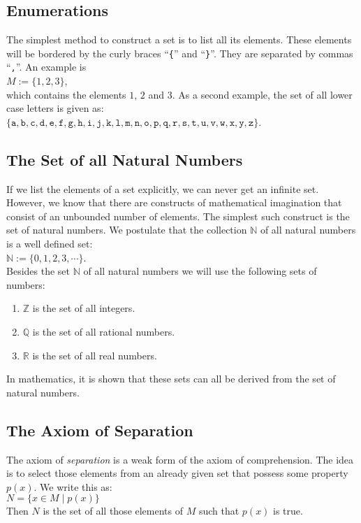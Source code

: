 \subsection{Enumerations}
The simplest method to construct a set is to list all its elements.  These elements
will be bordered by the curly braces ``\texttt{\{}'' and ``\texttt{\}}''.  They are
separated by commas ``\texttt{,}''.
An example is \\[0.2cm]
\hspace*{1.3cm} $M := \{ 1, 2, 3 \}$, \\[0.2cm]
which contains the elements  $1$, $2$ and $3$.
As a second example, the set of all lower case letters is given as: 
\\[0.2cm]
\hspace*{1.3cm} 
$\{\mathtt{a}, \mathtt{b}, \mathtt{c}, \mathtt{d}, \mathtt{e},
 \mathtt{f}, \mathtt{g}, \mathtt{h}, \mathtt{i}, \mathtt{j}, \mathtt{k}, \mathtt{l},
 \mathtt{m}, \mathtt{n}, \mathtt{o}, \mathtt{p}, \mathtt{q}, \mathtt{r}, \mathtt{s},
 \mathtt{t}, \mathtt{u}, \mathtt{v}, \mathtt{w}, \mathtt{x}, \mathtt{y}, \mathtt{z\}}$.

\subsection{The Set of all Natural Numbers}
If we list the elements of a set explicitly, we can never get an infinite set.
However, we know that there are constructs of mathematical imagination that consist
of an unbounded number of elements.  The simplest such construct is the set of natural
numbers.  We postulate that the collection $\mathbb{N}$ of all natural numbers is a well
defined set: \\[0.2cm]
\hspace*{1.3cm} $\mathbb{N} := \{ 0, 1, 2, 3, \cdots \}$. \\[0.2cm]
Besides the set $\mathbb{N}$ of all natural numbers we will use the following sets of
numbers:
\begin{enumerate}
\item $\mathbb{Z}$ is the set of all integers.
\item $\mathbb{Q}$ is the set of all rational numbers.
\item $\mathbb{R}$ is the set of all real numbers.
\end{enumerate}
In mathematics, it is shown that these sets can all be derived from the set of natural numbers.

\subsection{The Axiom of Separation}
The axiom of \emph{separation}  is a weak form of the axiom of comprehension.
The idea is to select those elements from an already given set that possess some property $p(x)$.
We write this as: \\[0.2cm]
\hspace*{1.3cm} 
$N = \{ x\in M \;|\; p(x) \}$ 
\\[0.2cm]
Then $N$ is the set of all those elements of $M$ such that $p(x)$ is true.
\vspace{0.2cm}

